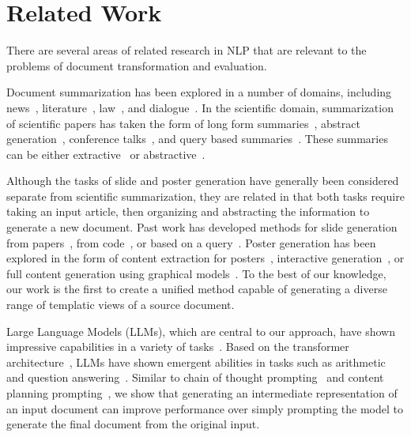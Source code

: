 \section{Related Work}

There are several areas of related research in NLP that are relevant to the problems of document transformation and evaluation.

Document summarization has been explored in a number of domains, including news~\cite{see-etal-2017-get}, literature~\cite{Scir2023EchoesFA}, law~\cite{Deroy2023HowRA}, and dialogue~\cite{Chen2021DialogSumAR}.
In the scientific domain, summarization of scientific papers has taken the form of long form summaries~\cite{chandrasekaran2020overview}, abstract generation~\cite{Cohan2015ScientificAS}, conference talks~\cite{Lev2019TalkSummAD}, and query based summaries~\cite{Fok2023QlarifyBS}. These summaries can be either extractive~\cite{Sefid2022SciBERTSUMES} or abstractive~\cite{chandrasekaran2020overview}. 

Although the tasks of slide and poster generation have generally been considered separate from scientific summarization, they are related in that both tasks require taking an input article, then organizing and abstracting the information to generate a new document. Past work has developed methods for slide generation from papers~\cite{Hu2015PPSGenLP, Li2021TowardsTS, Hu2015PPSGenLP,Fu2021DOC2PPTAP}, from code~\cite{Wang2023Slide4NCP}, or based on a query~\cite{Sun2021D2SDG}. Poster generation has been explored in the form of content extraction for posters~\cite{Xu2021NeuralCE}, interactive generation~\cite{Wang2015iPosterIP}, or full content generation using graphical models~\cite{Qiang2016LearningTG}. To the best of our knowledge, our work is the first to create a unified method capable of generating a diverse range of templatic views of a source document. %

Large Language Models (LLMs), which are central to our approach, have shown impressive capabilities in a variety of tasks~\cite{radford2019language,Brown2020LanguageMA}. Based on the transformer architecture~\cite{Vaswani2017AttentionIA}, LLMs have shown emergent abilities in tasks such as arithmetic and question answering~\cite{Wei2022EmergentAO}. %
Similar to chain of thought prompting~\cite{Wei2022ChainOT} and content planning prompting~\cite{Wang2022SelfConsistencyIC}, we show that generating an intermediate representation of an input document can improve performance over simply prompting the model to generate the final document from the original input. 

